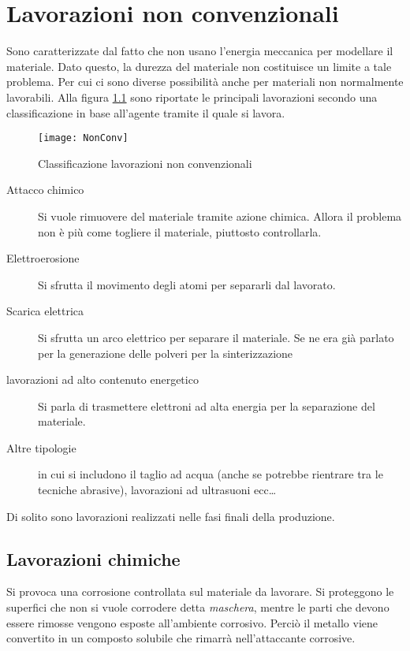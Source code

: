 \chapter{Lavorazioni non convenzionali}\label{chp:NonConvenzionale}
Sono caratterizzate dal fatto che non usano l'energia meccanica per modellare il materiale.
Dato questo, la durezza del materiale non costituisce un limite a tale problema. Per cui ci sono diverse possibilità anche per materiali non normalmente lavorabili.
Alla figura \ref{fig:NonConv} sono riportate le principali lavorazioni
secondo una classificazione in base all'agente tramite il quale si lavora.

\begin{figure}
\centering
\texttt{[image: NonConv]}
\caption{Classificazione lavorazioni non convenzionali}
\label{fig:NonConv}
\end{figure}

\begin{description}
\item[Attacco chimico] Si vuole rimuovere del materiale tramite azione chimica. Allora il problema non è più come togliere il materiale, piuttosto controllarla.
\item[Elettroerosione] Si sfrutta il movimento degli atomi per separarli dal lavorato.
\item[Scarica elettrica] Si sfrutta un arco elettrico per separare il materiale. Se ne era già parlato per la generazione delle polveri per la sinterizzazione
\item[lavorazioni ad alto contenuto energetico] Si parla di trasmettere elettroni ad alta energia per la separazione del materiale.
\item[Altre tipologie] in cui si includono il taglio ad acqua (anche se potrebbe rientrare tra le tecniche abrasive), lavorazioni ad ultrasuoni ecc\dots
\end{description}

Di solito sono lavorazioni realizzati nelle fasi finali della produzione.

\section{Lavorazioni chimiche}
Si provoca una corrosione controllata sul materiale da lavorare. Si proteggono le superfici che non si vuole corrodere detta \emph{maschera}, mentre le parti che devono essere rimosse vengono esposte all'ambiente corrosivo.
Perciò il metallo viene convertito in un composto solubile che rimarrà nell'attaccante corrosive.

